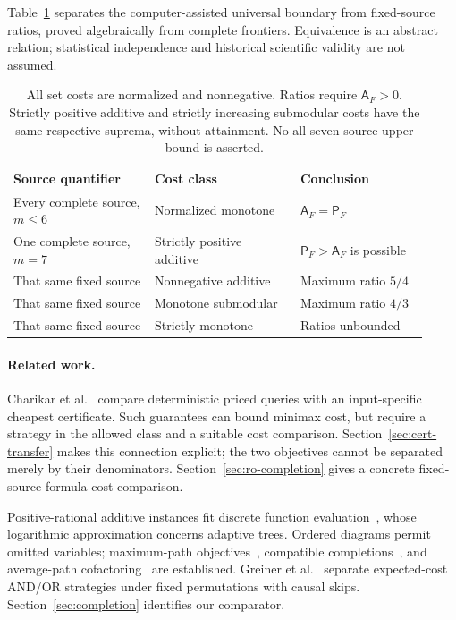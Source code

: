 \documentclass[pdflatex,sn-mathphys-num]{sn-jnl}
\newcommand{\A}{\mathsf{A}}
\newcommand{\Pcost}{\mathsf{P}}
\theoremstyle{thmstyleone}
\theoremstyle{thmstylethree}
\theoremstyle{thmstyletwo}
\begin{document}
Table~\ref{tab:scope} separates the computer-assisted universal boundary from fixed-source ratios, proved algebraically from complete frontiers. Equivalence is an abstract relation; statistical independence and historical scientific validity are not assumed.

\begin{table}[ht]
\centering\small
\begin{tabular}{@{}p{0.31\linewidth}p{0.32\linewidth}p{0.29\linewidth}@{}}\toprule
Source quantifier & Cost class & Conclusion\\\midrule
Every complete source, $m\leq6$ & Normalized monotone & $\A_F=\Pcost_F$\\
One complete source, $m=7$ & Strictly positive additive & $\Pcost_F>\A_F$ is possible\\
That same fixed source & Nonnegative additive & Maximum ratio $5/4$\\
That same fixed source & Monotone submodular & Maximum ratio $4/3$\\
That same fixed source & Strictly monotone & Ratios unbounded\\\bottomrule
\end{tabular}
\caption{All set costs are normalized and nonnegative. Ratios require $\A_F>0$. Strictly positive additive and strictly increasing submodular costs have the same respective suprema, without attainment. No all-seven-source upper bound is asserted.}\label{tab:scope}
\end{table}

\paragraph*{Related work.}
Charikar et al.~\cite{charikar02} compare deterministic priced queries with an input-specific cheapest certificate. Such guarantees can bound minimax cost, but require a strategy in the allowed class and a suitable cost comparison. Section~\ref{sec:cert-transfer} makes this connection explicit; the two objectives cannot be separated merely by their denominators. Section~\ref{sec:ro-completion} gives a concrete fixed-source formula-cost comparison.

Positive-rational additive instances fit discrete function evaluation~\cite{cicalese14}, whose logarithmic approximation concerns adaptive trees. Ordered diagrams permit omitted variables; maximum-path objectives~\cite{ebendt06,ebendt05}, compatible completions~\cite{oliveira,sasao}, and average-path cofactoring~\cite{jiang} are established. Greiner et al.~\cite{greiner} separate expected-cost AND/OR strategies under fixed permutations with causal skips. Section~\ref{sec:completion} identifies our comparator.
\end{document}
